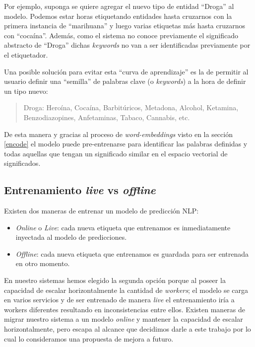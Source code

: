 \documentclass[12pt,a4paper,]{scrartcl}
\providecommand{\tightlist}{%
  \setlength{\itemsep}{0pt}\setlength{\parskip}{0pt}}
\begin{document}
Por ejemplo, suponga se quiere agregar el nuevo tipo de entidad \enquote{Droga} al modelo. Podemos estar horas etiquetando entidades hasta cruzarnos con la primera instancia de \enquote{marihuana} y luego varias etiquetas más hasta cruzarnos con \enquote{cocaína}. Además, como el sistema no conoce previamente el significado abstracto de \enquote{Droga} dichas \emph{keywords} no van a ser identificadas previamente por el etiquetador.

Una posible solución para evitar esta \enquote{curva de aprendizaje} es la de permitir al usuario definir una \enquote{semilla} de palabras clave (o \emph{keywords}) a la hora de definir un tipo nuevo:

\begin{quote}
Droga: Heroína, Cocaína, Barbitúricos, Metadona, Alcohol, Ketamina, Benzodiazopines, Anfetaminas, Tabaco, Cannabis, etc.
\end{quote}

De esta manera y gracias al proceso de \emph{word-embeddings} visto en la sección \ref{encode} el modelo puede pre-entrenarse para identificar las palabras definidas y todas aquellas que tengan un significado similar en el espacio vectorial de significados.

\hypertarget{entrenamiento-live-vs-offline}{%
\subsection{\texorpdfstring{Entrenamiento \emph{live} vs \emph{offline}}{Entrenamiento live vs offline}}\label{entrenamiento-live-vs-offline}}

Existen dos maneras de entrenar un modelo de predicción NLP:

\begin{itemize}
\tightlist
\item
  \emph{Online} o \emph{Live}: cada nueva etiqueta que entrenamos es inmediatamente inyectada al modelo de predicciones.
\item
  \emph{Offline}: cada nueva etiqueta que entrenamos es guardada para ser entrenada en otro momento.
\end{itemize}

En nuestro sistemas hemos elegido la segunda opción porque al poseer la capacidad de escalar horizontalmente la cantidad de \emph{workers}; el modelo se carga en varios servicios y de ser entrenado de manera \emph{live} el entrenamiento iría a workers diferentes resultando en inconsistencias entre ellos. Existen maneras de migrar nuestro sistema a un modelo \emph{online} y mantener la capacidad de escalar horizontalmente, pero escapa al alcance que decidimos darle a este trabajo por lo cual lo consideramos una propuesta de mejora a futuro.
\end{document}
